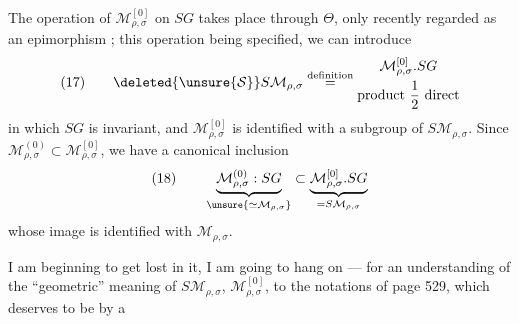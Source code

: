 The operation of $\mathcal M_{\rho,\sigma}^{[0]}$ on $SG$ takes place
through $\Theta$, only recently regarded as an epimorphism
;
this operation being specified, we can introduce
\[
(17)\qquad\deleted{\unsure{\mathcal S}}
S\mathcal M_{\rho,\sigma}\overset{\text{definition}}{=}
\begin{gathered}
\mathcal M_{\rho,\sigma}^{[0]}.SG\\
\text{product }\frac12\text{ direct}
\end{gathered}
\]
in which $SG$ is invariant, and $\mathcal M_{\rho,\sigma}^{[0]}$ is identified
with a subgroup of $S\mathcal M_{\rho,\sigma}$. Since
$\mathcal M_{\rho,\sigma}^{(0)}\subset\mathcal M_{\rho,\sigma}^{[0]}$,
we have a canonical inclusion
\[
(18)\qquad
\underbrace{\mathcal M_{\rho,\sigma}^{(0)}:SG}_{\unsure{\simeq\mathcal M_{\rho,\sigma}}}
\subset
\underbrace{\mathcal M_{\rho,\sigma}^{[0]}.SG}_{=S\mathcal M_{\rho,\sigma}}
\]
whose image is 
identified with $\mathcal M_{\rho,\sigma}$.

 I am beginning  to get lost in it, I am going to hang on
--- for an understanding of the ``geometric'' meaning of
$S\mathcal M_{\rho,\sigma}$, $\mathcal M_{\rho,\sigma}^{[0]}$, to the notations
of page 529, which deserves to be  by a



